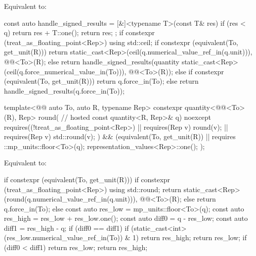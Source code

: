 \begin{itemdescr}
\pnum
\effects
Equivalent to:
\begin{codeblock}
const auto handle_signed_results = [&]<typename T>(const T& res) {
  if (res < q) {
    return res + T::one();
  }
  return res;
};
if constexpr (treat_as_floating_point<Rep>) {
  using std::ceil;
  if constexpr (equivalent(To, get_unit(R))) {
    return {static_cast<Rep>(ceil(q.numerical_value_ref_in(q.unit))),
            @@<To>(R)};
  } else {
    return handle_signed_results(quantity{
      static_cast<Rep>(ceil(q.force_numerical_value_in(To))), @@<To>(R)});
  }
} else {
  if constexpr (equivalent(To, get_unit(R))) {
    return q.force_in(To);
  } else {
    return handle_signed_results(q.force_in(To));
  }
}
\end{codeblock}
\end{itemdescr}

\begin{itemdecl}
template<@@ auto To, auto R, typename Rep>
constexpr quantity<@@<To>(R), Rep> round(                             // hosted
  const quantity<R, Rep>& q) noexcept
  requires((!treat_as_floating_point<Rep>) || requires(Rep v) { round(v); } ||
           requires(Rep v) { std::round(v); }) &&
            (equivalent(To, get_unit(R)) || requires {
              ::mp_units::floor<To>(q);
              representation_values<Rep>::one();
            });
\end{itemdecl}

\begin{itemdescr}
\pnum
\effects
Equivalent to:
\begin{codeblock}
if constexpr (equivalent(To, get_unit(R))) {
  if constexpr (treat_as_floating_point<Rep>) {
    using std::round;
    return {static_cast<Rep>(round(q.numerical_value_ref_in(q.unit))),
            @@<To>(R)};
  } else {
    return q.force_in(To);
  }
} else {
  const auto res_low = mp_units::floor<To>(q);
  const auto res_high = res_low + res_low.one();
  const auto diff0 = q - res_low;
  const auto diff1 = res_high - q;
  if (diff0 == diff1) {
    if (static_cast<int>(res_low.numerical_value_ref_in(To)) & 1) {
      return res_high;
    }
    return res_low;
  }
  if (diff0 < diff1) {
    return res_low;
  }
  return res_high;
}
\end{codeblock}
\end{itemdescr}

